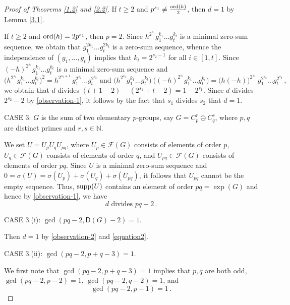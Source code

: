 \documentclass[a4paper,10pt]{amsart}
\theoremstyle{plain}
\theoremstyle{definition}
\newcommand{\N}{\mathbb N}
\numberwithin{equation}{section}
\begin{document}
\begin{proof}[Proof of Theorems \ref{1.2} and \ref{2.2}]
  If $t\ge 2$ and $p^{s_1}\neq \frac{\operatorname{ord}(h)}{2}$, then $d=1$ by Lemma \ref{3.1}.

   If $t\ge 2$ and $\operatorname{ord}(h)=2p^{s_1}$, then $p=2$. Since $h^{2^{s_1}}g_1^{k_1}\ldots g_t^{k_t}$ is a minimal zero-sum sequence, we obtain that $g_1^{2k_1}\ldots g_t^{2k_t}$ is a zero-sum sequence, whence the independence of $(g_1,\ldots, g_t)$ implies that $k_i=2^{s_2-1}$ for all $i\in [1,t]$. Since $(-h)^{2^{s_1}}g_1^{k_1}\ldots g_t^{k_t}$ is a minimal zero-sum sequence and
\[
\big( h^{2^{s_1}}g_1^{k_1}\ldots g_t^{k_t} \big)^2 =h^{2^{s_1+1}}\ g_1^{2^{s_2}}\ldots g_t^{2^{s_2}}
\text{ and } \big(h^{2^{s_1}}g_1^{k_1}\ldots g_t^{k_t} \big)\ \big( (-h)^{2^{s_1}}g_1^{k_1}\ldots g_t^{k_t} \big)= \big(h(-h) \big)^{2^{s_1}}\ g_1^{2^{s_2}}\ldots g_t^{2^{s_2}}\,,
\]
we obtain that $d$ divides $(t+1-2)-(2^{s_1}+t-2)=1-2^{s_1}$. Since $d$ divides $2^{s_2}-2$ by \eqref{observation-1}, it follows by the fact that  $s_1$ divides $s_2$ that  $d=1$.





	
\medskip
\noindent
CASE 3:  $G$ is the sum of two elementary $p$-groups, say $G = C_p^r \oplus C_q^s$, where $p, q$ are distinct primes and $r, s \in \N$.



We set $U = U_pU_q U_{pq}$, where $U_p \in \mathcal F (G)$ consists of elements of order $p$, $U_q \in \mathcal F (G)$ consists of elements of order $q$, and $U_{pq} \in \mathcal F (G)$ consists of elements of order $pq$. Since
$U$ is a minimal zero-sum sequence  and $0 = \sigma (U) = \sigma (U_p) + \sigma (U_q) + \sigma (U_{pq})$, it follows that $U_{pq}$ cannot be the empty sequence. Thus, $\operatorname{supp} (U)$ contains an element of order $pq = \exp (G)$ and hence by \eqref{observation-1}, we have
\begin{equation}\label{equation2}
d \text{ divides }pq-2\,.
\end{equation}

\medskip
\noindent
CASE 3.(i): $\gcd (pq-2, \mathsf D (G)-2) = 1$.

Then $d=1$   by  \eqref{observation-2} and \eqref{equation2}.


\medskip
\noindent
CASE 3.(ii): $\gcd(pq-2, p+q-3)=1$.

We first note that $\gcd(pq-2, p+q-3)=1$ implies that $p,q$ are both odd, $\gcd(pq-2, p-2)=1$,  $\gcd(pq-2, q-2)=1$, and
 \begin{equation} \label{equation1}
\gcd(pq-2, p-1)=1\,.
 \end{equation}



\end{proof}
\end{document}
